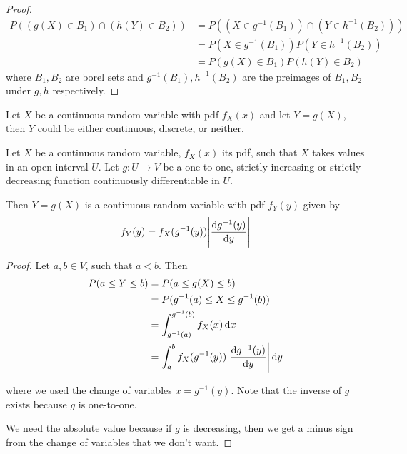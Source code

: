 \documentclass[14pt]{extarticle}
\begin{document}
\begin{proof}
    \skiplineafterproof
    \begin{align}
        P\left(
        (g(X) \in B_1) \cap (h(Y) \in B_2)
        \right) & = P\left(
        (X \in g^{-1}(B_1)) \cap (Y \in h^{-1}(B_2))
        \right)                                               \\
                & = P(X \in g^{-1}(B_1)) P(Y \in h^{-1}(B_2)) \\
                & = P(g(X) \in B_1) P(h(Y) \in B_2)
    \end{align}
    where $B_1, B_2$ are borel sets and $g^{-1}(B_1), h^{-1}(B_2)$ are the preimages of $B_1, B_2$ under $g, h$ respectively.
\end{proof}

\begin{remark}
    Let $X$ be a continuous random variable with pdf $f_X(x)$ and let $Y = g(X)$,
    then $Y$ could be either continuous, discrete, or neither.
\end{remark}

\begin{theorem}
    \label{thm:transformation_crv}

    Let $X$ be a continuous random variable, $f_X(x)$ its pdf, such that $X$ takes values in an open interval $U$.
    Let $g: U \to V$ be a one-to-one, strictly increasing or strictly decreasing function continuously differentiable in $U$.

    Then $Y = g(X)$ is a continuous random variable with pdf $f_Y(y)$ given by
    \begin{equation}
        f_Y(y) = f_X(g^{-1}(y)) \abs{\dv{g^{-1}(y)}{y}}
    \end{equation}
\end{theorem}

\begin{proof}
    Let $a, b \in V$, such that $a < b$.
    Then
    \begin{align}
        P(a \leq Y \leq b) & = P(a \leq g(X) \leq b)                                  \\
                           & = P(g^{-1}(a) \leq X \leq g^{-1}(b))                     \\
                           & = \int_{g^{-1}(a)}^{g^{-1}(b)} f_X(x) \dd{x}             \\
                           & = \int_a^b f_X(g^{-1}(y)) \abs{\dv{g^{-1}(y)}{y}} \dd{y}
    \end{align}

    where we used the change of variables $x = g^{-1}(y)$.
    Note that the inverse of $g$ exists because $g$ is one-to-one.

    We need the absolute value because if $g$ is decreasing, then we get a minus sign from the change of variables that we don't want.
\end{proof}
\end{document}
